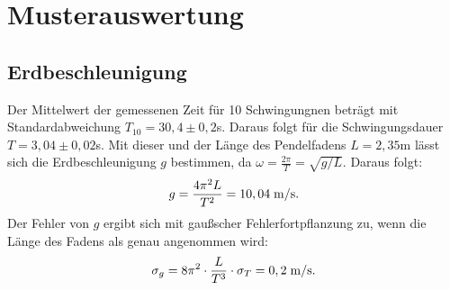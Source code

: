 \newpage
\section{Musterauswertung}
\subsection*{Erdbeschleunigung}
Der Mittelwert der gemessenen Zeit für 10 Schwingungnen beträgt mit Standardabweichung $T_{10}= 30,4\pm 0,2$\;s. Daraus folgt für die Schwingungsdauer $T=3,04\pm 0,02$\;s. Mit dieser und der Länge des Pendelfadens $L=2,35$\;m lässt sich die Erdbeschleunigung $g$ bestimmen, da $\omega=\frac{2\pi}{T}=\sqrt{g/L}$. Daraus folgt:\\
\begin{align*}
g=\frac{4\pi^2 L}{T^2}=10,04\; \rm{m/s}.
\end{align*} 
Der Fehler von $g$ ergibt sich mit gaußscher Fehlerfortpflanzung zu, wenn die Länge des Fadens als genau angenommen wird:
\begin{align*}
\sigma_{g}=8\pi^{2}\cdot\frac{L}{T^3}\cdot\sigma_{T}=0,2\;\rm{m/s}.
\end{align*}
